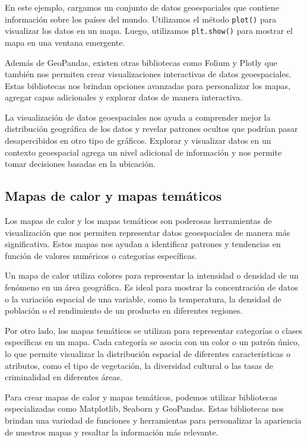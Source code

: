 \documentclass[
  a4paper,
]{article}
\begin{document}
En este ejemplo, cargamos un conjunto de datos geoespaciales que
contiene información sobre los países del mundo. Utilizamos el método
\texttt{plot()} para visualizar los datos en un mapa. Luego, utilizamos
\texttt{plt.show()} para mostrar el mapa en una ventana emergente.

Además de GeoPandas, existen otras bibliotecas como Folium y Plotly que
también nos permiten crear visualizaciones interactivas de datos
geoespaciales. Estas bibliotecas nos brindan opciones avanzadas para
personalizar los mapas, agregar capas adicionales y explorar datos de
manera interactiva.

La visualización de datos geoespaciales nos ayuda a comprender mejor la
distribución geográfica de los datos y revelar patrones ocultos que
podrían pasar desapercibidos en otro tipo de gráficos. Explorar y
visualizar datos en un contexto geoespacial agrega un nivel adicional de
información y nos permite tomar decisiones basadas en la ubicación.

\hypertarget{mapas-de-calor-y-mapas-temuxe1ticos}{%
\subsection{Mapas de calor y mapas
temáticos}\label{mapas-de-calor-y-mapas-temuxe1ticos}}

Los mapas de calor y los mapas temáticos son poderosas herramientas de
visualización que nos permiten representar datos geoespaciales de manera
más significativa. Estos mapas nos ayudan a identificar patrones y
tendencias en función de valores numéricos o categorías específicas.

Un mapa de calor utiliza colores para representar la intensidad o
densidad de un fenómeno en un área geográfica. Es ideal para mostrar la
concentración de datos o la variación espacial de una variable, como la
temperatura, la densidad de población o el rendimiento de un producto en
diferentes regiones.

Por otro lado, los mapas temáticos se utilizan para representar
categorías o clases específicas en un mapa. Cada categoría se asocia con
un color o un patrón único, lo que permite visualizar la distribución
espacial de diferentes características o atributos, como el tipo de
vegetación, la diversidad cultural o las tasas de criminalidad en
diferentes áreas.

Para crear mapas de calor y mapas temáticos, podemos utilizar
bibliotecas especializadas como Matplotlib, Seaborn y GeoPandas. Estas
bibliotecas nos brindan una variedad de funciones y herramientas para
personalizar la apariencia de nuestros mapas y resaltar la información
más relevante.
\end{document}
